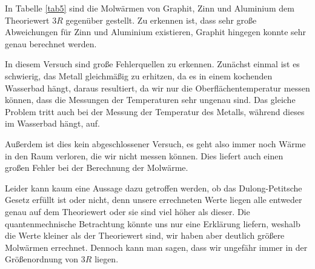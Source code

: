 In Tabelle \ref{tab5} sind die Molwärmen von Graphit, Zinn und Aluminium dem Theoriewert $3R$ gegenüber gestellt.
Zu erkennen ist, dass sehr große Abweichungen für Zinn und Aluminium existieren, Graphit hingegen konnte sehr genau berechnet werden.

In diesem Versuch sind große Fehlerquellen zu erkennen. Zunächst einmal ist es schwierig, das Metall gleichmäßig zu erhitzen,
da es in einem kochenden Wasserbad hängt, daraus resultiert, da wir nur die Oberflächentemperatur messen können, dass die Messungen
der Temperaturen sehr ungenau sind. Das gleiche Problem tritt auch bei der Messung der Temperatur des Metalls, während dieses im Wasserbad hängt, auf.

Außerdem ist dies kein abgeschlossener Versuch, es geht also immer noch Wärme in den Raum verloren, die wir nicht messen können.
Dies liefert auch einen großen Fehler bei der Berechnung der Molwärme.

Leider kann kaum eine Aussage dazu getroffen werden, ob das Dulong-Petitsche Gesetz erfüllt ist oder nicht, denn unsere errechneten
Werte liegen alle entweder genau auf dem Theoriewert oder sie sind viel höher als dieser. Die quantenmechnische Betrachtung könnte
uns nur eine Erklärung liefern, weshalb die Werte kleiner als der Theoriewert sind, wir haben aber deutlich größere Molwärmen errechnet.
Dennoch kann man sagen, dass wir ungefähr immer in der Größenordnung von $3R$ liegen.

\nocite{*}
\printbibliography
